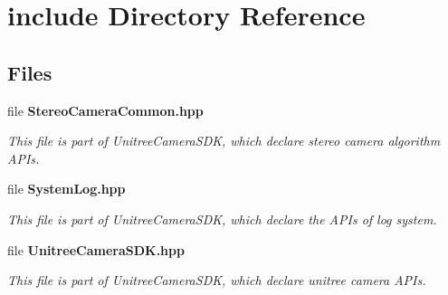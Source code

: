 \section{include Directory Reference}
\label{dir_d44c64559bbebec7f509842c48db8b23}
\subsection*{Files}
\begin{DoxyCompactItemize}
\item 
file \textbf{ Stereo\+Camera\+Common.\+hpp}
\begin{DoxyCompactList}\small\item\em This file is part of Unitree\+Camera\+S\+DK, which declare stereo camera algorithm A\+P\+Is. \end{DoxyCompactList}\item 
file \textbf{ System\+Log.\+hpp}
\begin{DoxyCompactList}\small\item\em This file is part of Unitree\+Camera\+S\+DK, which declare the A\+P\+Is of log system. \end{DoxyCompactList}\item 
file \textbf{ Unitree\+Camera\+S\+D\+K.\+hpp}
\begin{DoxyCompactList}\small\item\em This file is part of Unitree\+Camera\+S\+DK, which declare unitree camera A\+P\+Is. \end{DoxyCompactList}\end{DoxyCompactItemize}

